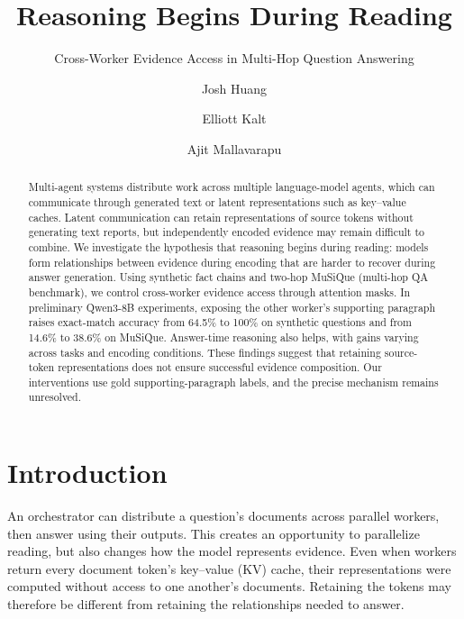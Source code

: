 \documentclass[sigconf,nonacm]{acmart}
\title{Reasoning Begins During Reading}
\subtitle{Cross-Worker Evidence Access in Multi-Hop Question Answering}
\author{Josh Huang}
\affiliation{\institution{Cornell Tech}\city{New York}\state{NY}\country{USA}}
\author{Elliott Kalt}
\affiliation{\institution{Cornell Tech}\city{New York}\state{NY}\country{USA}}
\author{Ajit Mallavarapu}
\affiliation{\institution{Cornell Tech}\city{New York}\state{NY}\country{USA}}
\begin{document}
\begin{abstract}
Multi-agent systems distribute work across multiple language-model agents,
which can communicate through generated text or latent representations such
as key--value caches. Latent communication can retain representations of
source tokens without generating text reports, but independently encoded
evidence may remain difficult to combine. We investigate the hypothesis
that reasoning begins during reading: models form relationships between
evidence during encoding that are harder to recover during answer generation.
Using synthetic fact chains and two-hop MuSiQue (multi-hop QA benchmark), we control cross-worker
evidence access through attention masks. In preliminary Qwen3-8B experiments,
exposing the other worker's supporting paragraph raises exact-match accuracy
from 64.5\% to 100\% on synthetic questions and from 14.6\% to 38.6\% on MuSiQue.
Answer-time reasoning also helps, with gains varying across tasks and encoding
conditions. These findings suggest that retaining source-token representations
does not ensure successful evidence composition. Our interventions use gold
supporting-paragraph labels, and the precise mechanism remains unresolved.
\end{abstract}

\maketitle



\section{Introduction}
An orchestrator can distribute a question's documents across parallel workers,
then answer using their outputs. This creates an opportunity to parallelize
reading, but also changes how the model represents evidence. Even when workers
return every document token's key--value (KV) cache, their representations were
computed without access to one another's documents. Retaining the tokens may
therefore be different from retaining the relationships needed to answer.
\end{document}

